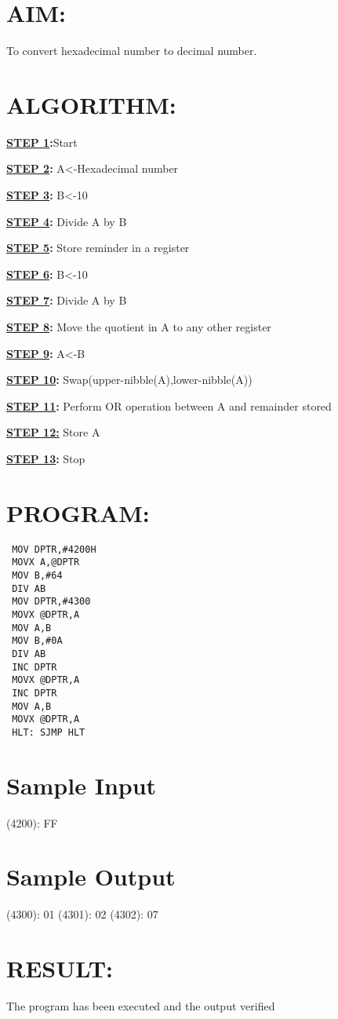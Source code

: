 
%
%
%
%
\section*{AIM:}
To convert hexadecimal number to decimal number.

\section*{ALGORITHM:}
\textbf{\underline{STEP 1}:}Start

\textbf{\underline{STEP 2}:} A<-Hexadecimal number

\textbf{\underline{STEP 3}:} B<-10

\textbf{\underline{STEP 4}:} Divide A by B

\textbf{\underline{STEP 5}:} Store reminder in a register

\textbf{\underline{STEP 6}:} B<-10

\textbf{\underline{STEP 7}:} Divide A by B

\textbf{\underline{STEP 8}:} Move the quotient in A to any other register

\textbf{\underline{STEP 9}:} A<-B

\textbf{\underline{STEP 10}:} Swap(upper-nibble(A),lower-nibble(A))

\textbf{\underline{STEP 11}:}  Perform OR operation between A and remainder stored

\textbf{\underline{STEP 12:}} Store A

\textbf{\underline{STEP 13}:} Stop


\section*{PROGRAM:}

\begin{lstlisting}
 MOV DPTR,#4200H 
 MOVX A,@DPTR 
 MOV B,#64 
 DIV AB 
 MOV DPTR,#4300 
 MOVX @DPTR,A 
 MOV A,B 
 MOV B,#0A 
 DIV AB 
 INC DPTR 
 MOVX @DPTR,A  
 INC DPTR 
 MOV A,B 
 MOVX @DPTR,A 
 HLT: SJMP HLT
\end{lstlisting}

\section*{Sample Input}
(4200): FF 

\section*{Sample Output}
(4300): 01 
(4301): 02 
(4302): 07 

\section*{RESULT:}
The program has been executed and the output verified
%
%
%
%
